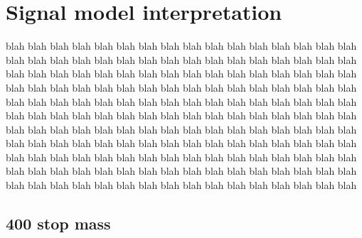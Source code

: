 \chapter[Signal model interpretation][Signal model interpretation]
        {Signal model interpretation}

blah blah blah blah blah blah blah blah blah blah blah blah blah blah blah blah
blah blah blah blah blah blah blah blah blah blah blah blah blah blah blah blah
blah blah blah blah blah blah blah blah blah blah blah blah blah blah blah blah
blah blah blah blah blah blah blah blah blah blah blah blah blah blah blah blah
blah blah blah blah blah blah blah blah blah blah blah blah blah blah blah blah
blah blah blah blah blah blah blah blah blah blah blah blah blah blah blah blah
blah blah blah blah blah blah blah blah blah blah blah blah blah blah blah blah
blah blah blah blah blah blah blah blah blah blah blah blah blah blah blah blah
blah blah blah blah blah blah blah blah blah blah blah blah blah blah blah blah
blah blah blah blah blah blah blah blah blah blah blah blah blah blah blah blah
blah blah blah blah blah blah blah blah blah blah blah blah blah blah blah blah

\newpage
\section{400 \texorpdfstring{\GeV}{GeV} stop mass}

